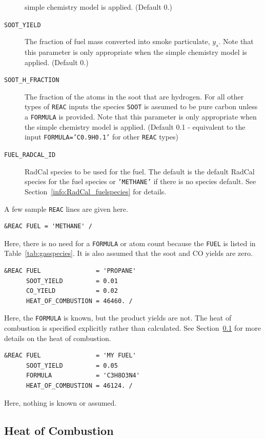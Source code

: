\documentclass[11pt]{book}
\newcommand{\ct}{\tt\small}
\begin{document}
\begin{description}
simple chemistry model is applied. (Default 0.)
\item[{\ct SOOT\_YIELD}] The fraction of fuel mass converted into smoke particulate, $y_s$.
Note that this parameter is only appropriate when the simple chemistry model is applied.  (Default 0.)
\item[{\ct SOOT\_H\_FRACTION}] The fraction of the atoms in the soot that are hydrogen.
For all other types of {\ct REAC} inputs the species {\ct SOOT} is assumed to be pure carbon unless a {\ct FORMULA} is provided.
Note that this parameter is only appropriate when the simple chemistry model is applied.
(Default 0.1 - equivalent to the input {\ct FORMULA='C0.9H0.1'} for other {\ct REAC} types)
\item[{\ct FUEL\_RADCAL\_ID}] RadCal species to be used for the fuel.  The default is the default RadCal species for the fuel species or {\ct 'METHANE'} if there is no species default. See Section~\ref{info:RadCal_fuelspecies} for details.
\end{description}

\noindent
A few sample {\ct REAC} lines are given here.

\footnotesize
\begin{verbatim}
&REAC FUEL = 'METHANE' /
\end{verbatim}
\normalsize
\noindent Here, there is no need for a {\ct FORMULA} or atom count because the {\ct FUEL} is listed in Table~\ref{tab:gasspecies}. It is also assumed that the soot and CO
yields are zero.

\footnotesize
\begin{verbatim}
&REAC FUEL               = 'PROPANE'
      SOOT_YIELD         = 0.01
      CO_YIELD           = 0.02
      HEAT_OF_COMBUSTION = 46460. /
\end{verbatim}
\normalsize
\noindent Here, the {\ct FORMULA} is known, but the product yields are not. The heat of combustion is specified explicitly rather than calculated. See
Section~\ref{info:heat_of_combustion} for more details on the heat of combustion.

\footnotesize
\begin{verbatim}
&REAC FUEL               = 'MY FUEL'
      SOOT_YIELD         = 0.05
      FORMULA            = 'C3H8O3N4'
      HEAT_OF_COMBUSTION = 46124. /
\end{verbatim}
\normalsize
\noindent Here, nothing is known or assumed.




\subsection{Heat of Combustion}
\label{info:heat_of_combustion}
\end{document}
